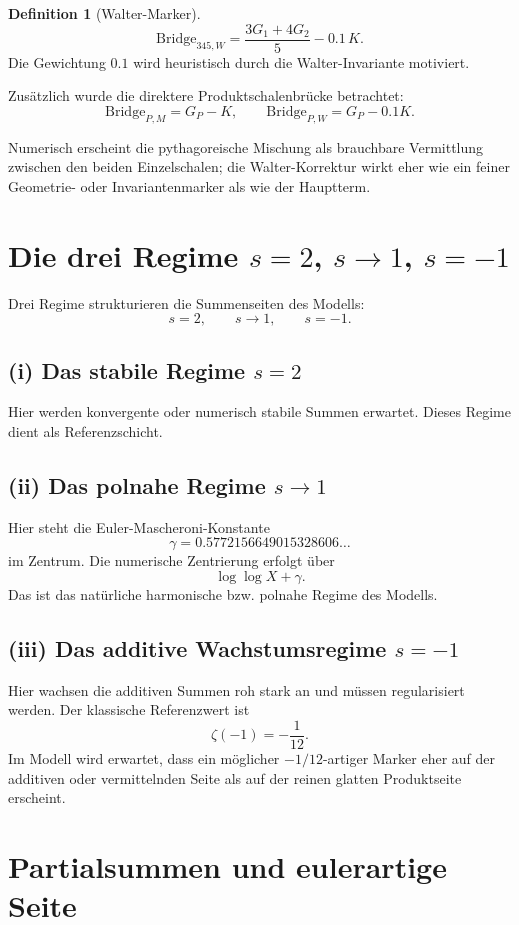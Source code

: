\documentclass[11pt,a4paper]{article}
\theoremstyle{definition}
\newtheorem{definition}{Definition}
\begin{document}
\begin{definition}[Walter-Marker]
\[
\mathrm{Bridge}_{345,W}=\frac{3G_1+4G_2}{5}-0.1\,K.
\]
Die Gewichtung $0.1$ wird heuristisch durch die Walter-Invariante motiviert.
\end{definition}

Zusätzlich wurde die direktere Produktschalenbrücke betrachtet:
\[
\mathrm{Bridge}_{P,M}=G_P-K,
\qquad
\mathrm{Bridge}_{P,W}=G_P-0.1K.
\]

Numerisch erscheint die pythagoreische Mischung als brauchbare Vermittlung zwischen den beiden Einzelschalen; die Walter-Korrektur wirkt eher wie ein feiner Geometrie- oder Invariantenmarker als wie der Hauptterm.

\section{Die drei Regime $s=2$, $s\to 1$, $s=-1$}

Drei Regime strukturieren die Summenseiten des Modells:
\[
s=2,\qquad s\to 1,\qquad s=-1.
\]

\subsection*{(i) Das stabile Regime $s=2$}
Hier werden konvergente oder numerisch stabile Summen erwartet. Dieses Regime dient als Referenzschicht.

\subsection*{(ii) Das polnahe Regime $s\to 1$}
Hier steht die Euler-Mascheroni-Konstante
\[
\gamma = 0.5772156649015328606\dots
\]
im Zentrum. Die numerische Zentrierung erfolgt über
\[
\log\log X + \gamma.
\]
Das ist das natürliche harmonische bzw. polnahe Regime des Modells.

\subsection*{(iii) Das additive Wachstumsregime $s=-1$}
Hier wachsen die additiven Summen roh stark an und müssen regularisiert werden. Der klassische Referenzwert ist
\[
\zeta(-1)=-\frac{1}{12}.
\]
Im Modell wird erwartet, dass ein möglicher \(-1/12\)-artiger Marker eher auf der additiven oder vermittelnden Seite als auf der reinen glatten Produktseite erscheint.

\section{Partialsummen und eulerartige Seite}
\end{document}

